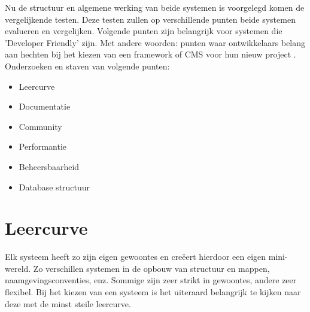 \label{ch:corpus}

Nu de structuur en algemene werking van beide systemen is voorgelegd komen de vergelijkende testen. Deze testen zullen op verschillende punten beide systemen evalueren en vergelijken. Volgende punten zijn belangrijk voor systemen die 'Developer Friendly' zijn. Met andere woorden: punten waar ontwikkelaars belang aan hechten bij het kiezen van een framework of CMS voor hun nieuw project \citep{Siddharth200915Framework}.
\newline\newline\noindent
Onderzoeken en staven van volgende punten:
\begin{itemize}
\item Leercurve
\item Documentatie
\item Community
\item Performantie
\item Beheersbaarheid
\item Database structuur
\end{itemize}

\section{Leercurve}
\label{Leercurve}
Elk systeem heeft zo zijn eigen gewoontes en creëert hierdoor een eigen mini-wereld. Zo verschillen systemen in de opbouw van structuur en mappen, naamgevingsconventies, enz. Sommige zijn zeer strikt in gewoontes, andere zeer flexibel. Bij het kiezen van een systeem is het uiteraard belangrijk te kijken naar deze met de minst steile leercurve.

